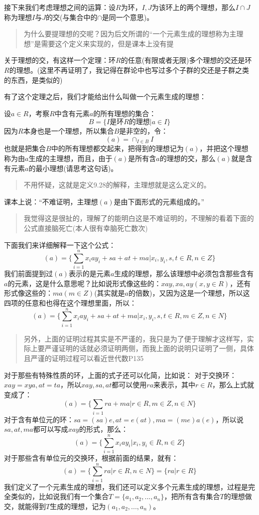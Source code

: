 \documentclass[12pt, a4paper, oneside]{ctexart}
\newenvironment{myquote}{\begin{quote}\small\color{gray}}{\end{quote}}
\begin{document}
接下来我们考虑理想之间的运算：设$R$为环，$I,J$为该环上的两个理想，那么$I\cap J$称为理想$I$与$J$的交(与集合中的$\cap$是同一个意思)。

\begin{myquote}
为什么要提理想的交呢？因为后文所谓的“一个元素生成的理想称为主理想”是需要这个定义来实现的，但是课本上没有提
\end{myquote}

关于理想的交，有这样一个定理：环$R$的任意(有限或者无限)多个理想的交还是环$R$的理想。(这里不再证明了，我记得在群论中也写过多个子群的交还是子群之类的东西，是类似的)

有了这个定理之后，我们才能给出什么叫做一个元素生成的理想：

设$a\in R$，考察$R$中含有元素$a$的所有理想的集合：
\[
B=\{I是环R的理想|a\in I\}
\]
因为$R$本身也是一个理想，所以集合$B$是非空的，令：
\[
(a)=\cap_{I\in B}I
\]
也就是把集合$B$中的所有理想都交起来，把得到的理想记为$(a)$，并把这个理想称为由$a$生成的主理想，而且，由于$(a)$是所有含$a$的理想的交，那么$(a)$就是含有元素$a$的最小理想(请思考这句话)。

\begin{myquote}
不用怀疑，这就是定义9.28的解释，主理想就是这么定义的。
\end{myquote}

课本上说：“不难证明，主理想$(a)$是由下面形式的元素组成的。”

\begin{myquote}
 我觉得这是很扯的，理解了的能明白这是不难证明的，不理解的看着下面的公式直接脑死亡(本人很有幸脑死亡数次)
\end{myquote}

下面我们来详细解释一下这个公式：
\[
(a)=\{\sum_{i=1}^nx_iay_i+sa+at+ma|x_i,y_i,s,t\in R,n\in Z\}
\]
我们前面提到过$(a)$表示的是元素$a$生成的理想，那么该理想中必须包含那些含有$a$的元素，这是什么意思呢？比如说形式像这些的：$xay,xa,ay(x,y\in R)$，还有形式像这些的：$ma(m\in Z)$(其实就是$a$的倍数)，又因为这是一个理想，所以这四项的任意和也得在这个理想里面，所以：
\[
(a)=\{\sum_{i=1}^nx_iay_i+sa+at+ma|x_i,y_i,s,t\in R,m\in Z,n\in N\}
\]
\begin{myquote}
另外，上面的证明过程其实是不严谨的，我只是为了便于理解才这样写，实际上要严谨证明的话就必须证明两侧，而我上面的说明只证明了一侧，具体且严谨的证明过程可以看近世代数P135

\end{myquote}

对于那些有特殊性质的环，上面的式子还可以化简，比如说：
对于交换环：$xay=xya,at=ta$，所以$xay,sa,at$都可以使用$ra$来表示，其中$r\in R$，那么上式就变成了：
\[
(a)=\{\sum_{i=1}ra+ma|r\in R,m\in Z,n\in N\}
\]
对于含有单位元的环：$sa=(sa)e,at=e(at),ma=(me)a(e)$，所以说$sa,at,ma$都可以写成$xay$的形式，那么：
\[
(a)=\{\sum_{i=1}^nx_iay_i|x_i,y_i\in R,n\in Z\}
\]
对于那些含有单位元的交换环，根据前面的结果，就有：
\[
(a)=\{\sum_{i=1}^nra|r\in R,n\in N\}=\{ra|r\in R\}
\]
我们定义了一个元素生成的理想，我们还可以定义多个元素生成的理想，过程是完全类似的，比如说我们有一个集合$T=\{a_1,a_2,...,a_n\}$，把所有含有集合$T$的理想做交，就能得到$T$生成的理想，记为$(a_1,a_2,...,a_n)$。
\end{document}
